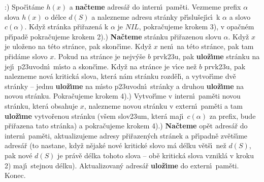 :) Spo\v c\'\i t\'ame $h(x)$ a {\bf na\v cteme} adres\'a\v r do intern\'\i\ pam\v eti. 
Vez\-me\-me prefix $\alpha$ slova $h(x)$ o d\'elce $d(S)$ a nalezneme 
adresu str\'anky p\v r\'\i slu\v sej\'\i c\'\i\ k $\alpha$ a slovo $
c(\alpha )$. 
Kdy\v z str\'anka p\v ri\v razen\'a k $\alpha$ je $NIL$, pokra\v cu\-je\-me krokem 
3), v opa\v cn\'em p\v r\'\i pad\v e pokra\v cu\-je\-me krokem 2).) {\bf Na\v cteme} str\'anku p\v ri\v razenou slovu $\alpha$. Kdy\v z $
x$ je 
ulo\v zeno na t\'eto str\'ance, pak skon\v c\'\i me. Kdy\v z $x$ nen\'\i\ na 
t\'eto str\'ance, pak tam p\v rid\'ame slovo $x$. Pokud na str\'ance 
je nejv\'y\v se $b$ prvk\accent23u, pak {\bf ulo\v z\'\i me} str\'anku 
na jej\'\i\ p\accent23uvodn\'\i\ m\'\i sto a skon\v c\'\i me. Kdy\v z na 
str\'ance je v\'\i ce ne\v z $b$ prvk\accent23u, pak nalezneme nov\'a 
kritick\'a slova, 
kter\'a n\'am str\'anku rozd\v el\'\i , a vytvo\v r\'\i me dv\v e str\'anky -- 
jednu {\bf ulo\v z\'\i me} na m\'\i sto p\accent23uvodn\'\i\ str\'anky a 
druhou {\bf ulo\v z\'\i me} na novou str\'anku. Pokra\v cujeme krokem 
4).) Vytvo\v r\'\i me v intern\'\i\ pam\v eti novou str\'anku, kter\'a 
obsahuje $x$, nalezneme novou str\'anku v extern\'\i\ pam\v eti a 
tam {\bf ulo\v z\'\i me} vytvo\v renou str\'anku (v\v sem slov\accent23um, 
kter\'a maj\'\i\ $c(\alpha )$ za prefix, bude p\v ri\v razena tato str\'anka) a 
pokra\v cujeme krokem 4).) {\bf Na\v cteme} op\v et adres\'a\v r do intern\'\i\ pam\v eti, 
aktualizujeme adresy p\v ri\v razen\'ych str\'anek a p\v r\'\i padn\v e 
zv\v et\v s\'\i me adres\'a\v r (to nastane, kdy\v z n\v ejak\'e nov\'e kritick\'e 
slovo m\'a d\'elku v\v et\v s\'\i\ ne\v z $d(S)$, pak nov\'e $d(S
)$ je pr\'av\v e 
d\'elka tohoto slova -- ob\v e kritick\'a slova vznikl\'a v kroku 
2) maj\'\i\ stejnou d\'elku). Aktualizovan\'y adres\'a\v r {\bf ulo\v z\'\i me} do 
extern\'\i\ pam\v eti. Konec.
\medskip

